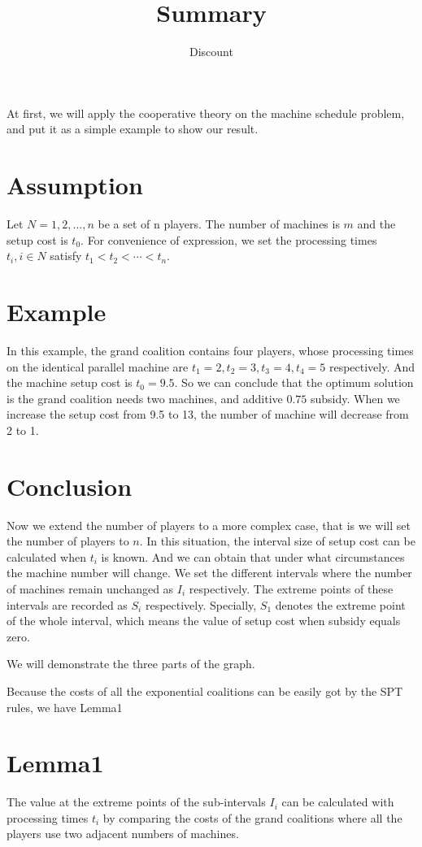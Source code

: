 \documentclass[UTF8]{article}
\title{Summary}
\author{Dis\cdot count}
\begin{document}
\maketitle{}
At first, we will apply the cooperative theory on the machine schedule problem, and put it as a simple example to show our result.

\section{Assumption}
Let $N={1,2,\ldots,n}$ be a set of n players. The number of machines is $m$ and the setup cost is $t_0$.
For convenience of expression, we set the processing times $t_i, i\in N$ satisfy $t_1<t_2<\cdots<t_n$.

\section{Example}
In this example, the grand coalition contains four players, whose processing times on the identical parallel machine are $t_1=2,t_2=3,t_3=4,t_4=5$ respectively. And the machine setup cost is $t_0=9.5$.
So we can conclude that the optimum solution is the grand coalition needs two machines, and additive $0.75$ subsidy. When we increase the setup cost from 9.5 to 13, the number of machine will decrease from 2 to 1.

\section{Conclusion}
Now we extend the number of players to a more complex case, that is we will set the number of players to $n$.
In this situation, the interval size of setup cost can be calculated when $t_i$ is known. And we can obtain that under what circumstances the machine number will change. We set the different intervals where the number of machines remain unchanged as $I_i$ respectively. The extreme points of these intervals are recorded as $S_i$ respectively. Specially, $S_1$ denotes the extreme point of the whole interval, which means the value of setup cost when subsidy equals zero.


We will demonstrate the three parts of the graph.




Because the costs of all the exponential coalitions can be easily got by the SPT rules, we have Lemma1

\section{Lemma1}
The value at the extreme points of the sub-intervals $I_i$ can be calculated with processing times $t_i$ by comparing the costs of the grand coalitions where all the players use two adjacent numbers of machines.
\end{document}
